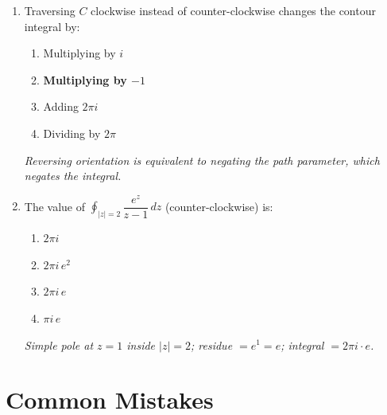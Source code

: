 \documentclass[12pt,a4paper]{article}
\begin{document}
\begin{enumerate}[label=\textbf{MCQ \arabic*.}, leftmargin=*]
\item Traversing $C$ clockwise instead of counter-clockwise changes the contour
  integral by:
  \begin{enumerate}[label=(\alph*)]
    \item Multiplying by $i$
    \item \textbf{Multiplying by $-1$}
    \item Adding $2\pi i$
    \item Dividing by $2\pi$
  \end{enumerate}
  \textit{Reversing orientation is equivalent to negating the path parameter,
  which negates the integral.}

\item The value of $\oint_{|z|=2}\dfrac{e^z}{z-1}\,dz$ (counter-clockwise) is:
  \begin{enumerate}[label=(\alph*)]
    \item $2\pi i$
    \item $2\pi i\,e^2$
    \item \textbf{$2\pi i\,e$}
    \item $\pi i\,e$
  \end{enumerate}
  \textit{Simple pole at $z=1$ inside $|z|=2$; residue $= e^1 = e$; integral
  $= 2\pi i \cdot e$.}

\end{enumerate}

\section{Common Mistakes}
\end{document}
